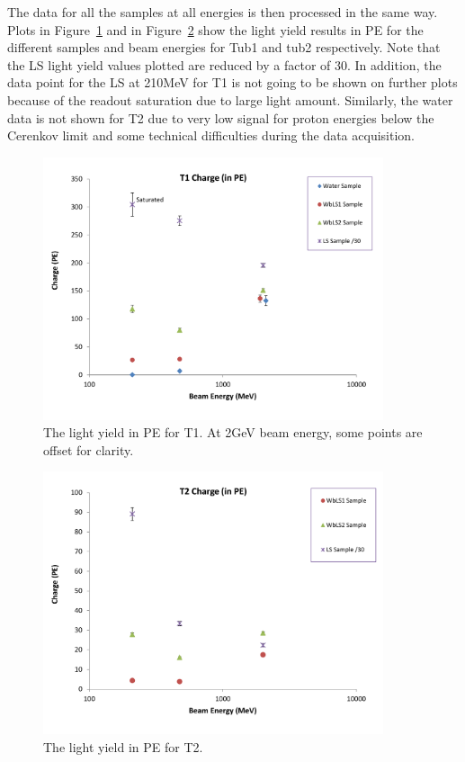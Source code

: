 \documentclass[preprint,12pt]{elsarticle}
\begin{document}
The data for all the samples at all energies is then processed in the same way. Plots in Figure~\ref{tub1signalInPE} and in Figure~\ref{tub2signalInPE} show the light yield results in PE for the different samples and beam energies for Tub1 and tub2 respectively. Note that the LS light yield values plotted are reduced by a factor of 30. In addition, the data point for the LS at 210MeV for T1 is not going to be shown on further plots because of the readout saturation due to large light amount. Similarly, the water data is not shown for T2 due to very low signal for proton energies below the Cerenkov limit and some technical difficulties during the data acquisition.

\begin{figure}[ht]
	\centering
		\includegraphics[width=100mm]{tub1signalInPE.pdf}
	\caption{The light yield in PE for T1. At 2GeV beam energy, some points are offset for clarity.}
	\label{tub1signalInPE}
\end{figure}

\begin{figure}[ht]
	\centering
		\includegraphics[width=100mm]{tub2signalInPE.pdf}
	\caption{The light yield in PE for T2.}
	\label{tub2signalInPE}
\end{figure}
\end{document}
